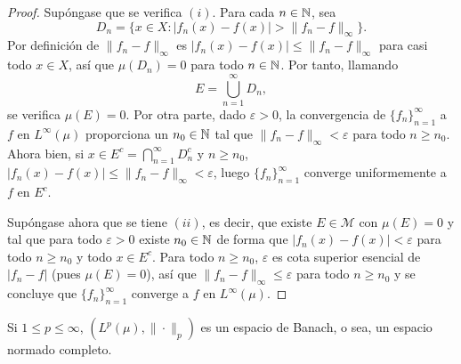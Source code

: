 \documentclass[a4paper, 11pt, oneside]{report}
\begin{document}
\begin{proof}
  Supóngase que se verifica $(i)$. Para cada $n \in \mathbb N$, sea
  \[D_n = \{x \in X \colon |f_n(x)-f(x)| > \|f_n-f\|_{\infty}\}.\]
  Por definición de $\|f_n-f\|_\infty$ es $|f_n(x)-f(x)| \leq \|f_n-f\|_{\infty}$ para casi todo $x \in X$, así que $\mu(D_n) = 0$ para todo $n \in \mathbb N$. Por tanto, llamando \[E = \bigcup_{n=1}^\infty D_n,\] se verifica $\mu(E)=0$. Por otra parte, dado $\varepsilon>0$, la convergencia de $\{f_n\}_{n=1}^\infty$ a $f$ en $L^\infty(\mu)$ proporciona un $n_0 \in \mathbb N$ tal que $\|f_n-f\|_\infty<\varepsilon$ para todo $n \geq n_0$. Ahora bien, si $x \in E^c = \bigcap_{n=1}^\infty D_n^c$ y $n \geq n_0$,
  $|f_n(x)-f(x)| \leq \|f_n-f\|_{\infty} < \varepsilon$, luego $\{f_n\}_{n=1}^\infty$ converge uniformemente a $f$ en $E^c$. 

  Supóngase ahora que se tiene $(ii)$, es decir, que existe $E\in \mathcal{M}$ con $\mu(E) = 0$ y tal que para todo $\varepsilon>0$ existe $n_0 \in \mathbb N$ de forma que $|f_n(x)-f(x)| < \varepsilon$ para todo $n \geq n_0$ y todo $x \in E^c$. Para todo $n \geq n_0$, $\varepsilon$ es cota superior esencial de $|f_n-f|$ (pues $\mu(E)=0$), así que $\|f_n-f\|_{\infty} \leq \varepsilon$ para todo $n \geq n_0$ y se concluye que $\{f_n\}_{n=1}^\infty$ converge a $f$ en $L^\infty(\mu)$.
\end{proof}

\begin{theorem}
  Si $1 \leq p \leq \infty$, $(L^p(\mu),\|\cdot\|_p)$ es un espacio de Banach, o sea, un espacio normado completo.
\end{theorem}
\end{document}
